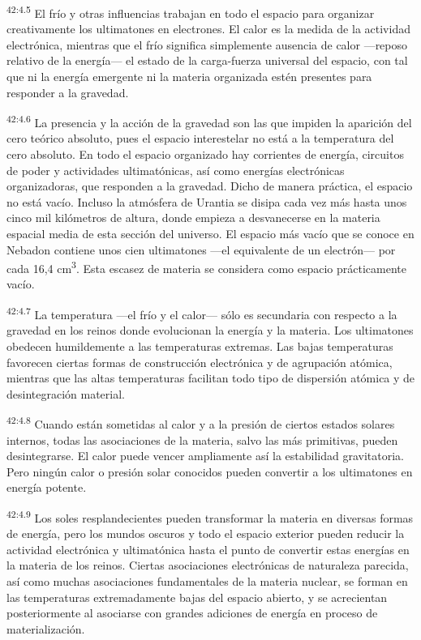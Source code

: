 \par
\textsuperscript{42:4.5} El frío y otras influencias trabajan en todo el espacio para organizar creativamente los ultimatones en electrones. El calor es la medida de la actividad electrónica, mientras que el frío significa simplemente ausencia de calor ---reposo relativo de la energía--- el estado de la carga-fuerza universal del espacio, con tal que ni la energía emergente ni la materia organizada estén presentes para responder a la gravedad.

\par
\textsuperscript{42:4.6} La presencia y la acción de la gravedad son las que impiden la aparición del cero teórico absoluto, pues el espacio interestelar no está a la temperatura del cero absoluto. En todo el espacio organizado hay corrientes de energía, circuitos de poder y actividades ultimatónicas, así como energías electrónicas organizadoras, que responden a la gravedad. Dicho de manera práctica, el espacio no está vacío. Incluso la atmósfera de Urantia se disipa cada vez más hasta unos cinco mil kilómetros de altura, donde empieza a desvanecerse en la materia espacial media de esta sección del universo. El espacio más vacío que se conoce en Nebadon contiene unos cien ultimatones ---el equivalente de un electrón--- por cada 16,4 cm\textsuperscript{3}. Esta escasez de materia se considera como espacio prácticamente vacío.

\par
\textsuperscript{42:4.7} La temperatura ---el frío y el calor--- sólo es secundaria con respecto a la gravedad en los reinos donde evolucionan la energía y la materia. Los ultimatones obedecen humildemente a las temperaturas extremas. Las bajas temperaturas favorecen ciertas formas de construcción electrónica y de agrupación atómica, mientras que las altas temperaturas facilitan todo tipo de dispersión atómica y de desintegración material.

\par
\textsuperscript{42:4.8} Cuando están sometidas al calor y a la presión de ciertos estados solares internos, todas las asociaciones de la materia, salvo las más primitivas, pueden desintegrarse. El calor puede vencer ampliamente así la estabilidad gravitatoria. Pero ningún calor o presión solar conocidos pueden convertir a los ultimatones en energía potente.

\par
\textsuperscript{42:4.9} Los soles resplandecientes pueden transformar la materia en diversas formas de energía, pero los mundos oscuros y todo el espacio exterior pueden reducir la actividad electrónica y ultimatónica hasta el punto de convertir estas energías en la materia de los reinos. Ciertas asociaciones electrónicas de naturaleza parecida, así como muchas asociaciones fundamentales de la materia nuclear, se forman en las temperaturas extremadamente bajas del espacio abierto, y se acrecientan posteriormente al asociarse con grandes adiciones de energía en proceso de materialización.

